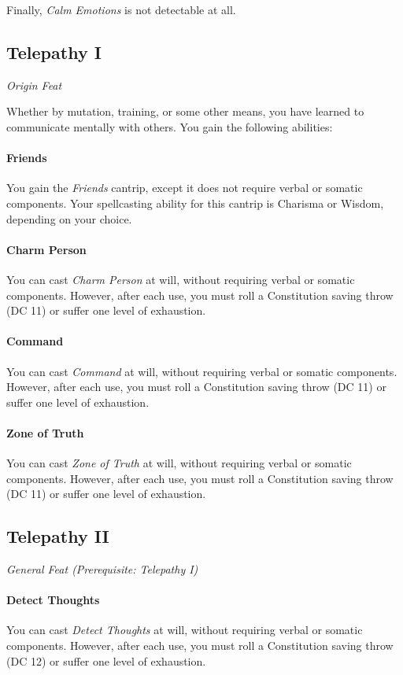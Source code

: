 \documentclass[twocolumn]{dndbook}
\begin{document}
Finally, \emph{Calm Emotions} is not detectable at all.\par


\subsection{Telepathy I}
{\emph{Origin Feat}}\par
Whether by mutation, training, or some other means, you have learned to communicate mentally with others.
You gain the following abilities:
\paragraph*{Friends} You gain the \emph{Friends} cantrip,
except it does not require verbal or somatic components.
Your spellcasting ability for this cantrip is Charisma or Wisdom, depending on your choice.
\paragraph*{Charm Person} You can cast \emph{Charm Person} at will,
without requiring verbal or somatic components. However, after each use, you must roll a Constitution saving throw (DC 11) or suffer one level of exhaustion.
\paragraph*{Command} You can cast \emph{Command} at will,
without requiring verbal or somatic components. However, after each use, you must roll a Constitution saving throw (DC 11) or suffer one level of exhaustion.
\paragraph*{Zone of Truth} You can cast \emph{Zone of Truth} at will,
without requiring verbal or somatic components. However, after each use, you must roll a Constitution saving throw (DC 11) or suffer one level of exhaustion.

\subsection{Telepathy II}
{\emph{General Feat (Prerequisite: Telepathy I)}}\par
\paragraph*{Detect Thoughts} You can cast \emph{Detect Thoughts} at will,
without requiring verbal or somatic components. However, after each use, you must roll a Constitution saving throw (DC 12) or suffer one level of exhaustion.
\end{document}
